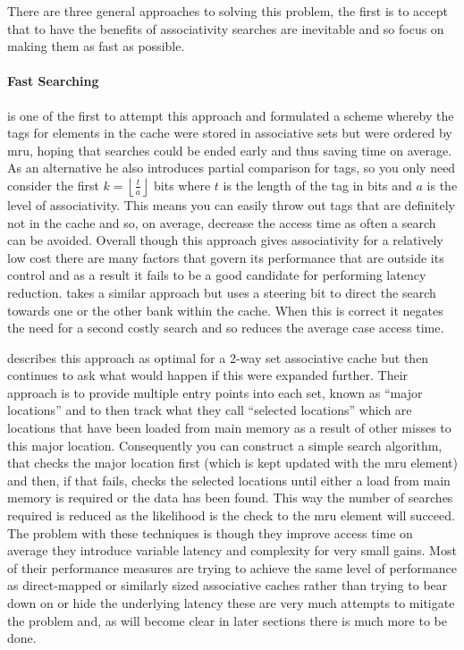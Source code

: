 There are three general approaches to solving this problem, the first is to accept that to have the benefits of associativity searches are inevitable and so focus on making them as fast as possible.

\paragraph{Fast Searching}
\citet{kesslerInexpensiveImplementationsSetAssociativity1989} is one of the first to attempt this approach and formulated a scheme whereby the tags for elements in the cache were stored in associative sets but were ordered by \gls{mru}, hoping that searches could be ended early and thus saving time on average. As an alternative he also introduces partial comparison for tags, so you only need consider the first $k = \left\lfloor\frac{t}{a}\right\rfloor$ bits where $t$ is the length of the tag in bits and $a$ is the level of associativity. This means you can easily throw out tags that are definitely not in the cache and so, on average, decrease the access time as often a search can be avoided. Overall though this approach gives associativity for a relatively low cost there are many factors that govern its performance that are outside its control and as a result it fails to be a good candidate for performing latency reduction. \citet{calderPredictiveSequentialAssociative1996} takes a similar approach but uses a steering bit to direct the search towards one or the other bank within the cache. When this is correct it negates the need for a second costly search and so reduces the average case access time.

\citet{chenxizhangMulticolumnImplementationsCache1997} describes this approach as optimal for a 2-way set associative cache but then continues to ask what would happen if this were expanded further. Their approach is to provide multiple entry points into each set, known as ``major locations'' and to then track what they call ``selected locations'' which are locations that have been loaded from main memory as a result of other misses to this major location. Consequently you can construct a simple search algorithm, that checks the major location first (which is kept updated with the \gls{mru} element) and then, if that fails, checks the selected locations until either a load from main memory is required or the data has been found. This way the number of searches required is reduced as the likelihood is the check to the \gls{mru} element will succeed. The problem with these techniques is though they improve access time on average they introduce variable latency and complexity for very small gains. Most of their performance measures are trying to achieve the same level of performance as direct-mapped or similarly sized associative caches rather than trying to bear down on or hide the underlying latency these are very much attempts to mitigate the problem and, as will become clear in later sections there is much more to be done.

